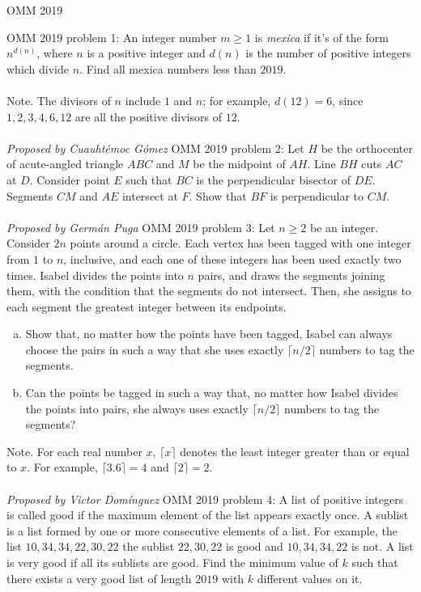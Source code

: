 
OMM 2019 

OMM 2019 problem 1:  An integer number $m\geq 1$ is \textit{mexica} if it's of the form $n^{d(n)}$, where $n$ is a positive integer and $d(n)$ is the number of positive integers which divide $n$. Find all mexica numbers less than $2019$. \\\\
Note. The divisors of $n$ include $1$ and $n$; for example, $d(12)=6$, since $1, 2, 3, 4, 6, 12$ are all the positive divisors of $12$. \\\\
\textit{Proposed by Cuauhtémoc Gómez} 
OMM 2019 problem 2:  Let $H$ be the orthocenter of acute-angled triangle $ABC$ and $M$ be the midpoint of $AH$. Line $BH$ cuts $AC$ at $D$. Consider point $E$ such that $BC$ is the perpendicular bisector of $DE$. Segments $CM$ and $AE$ intersect at $F$. Show that $BF$ is perpendicular to $CM$. \\\\
\textit{Proposed by Germán Puga} 
OMM 2019 problem 3:  Let $n\geq 2$ be an integer. Consider $2n$ points around a circle. Each vertex has been tagged with one integer from $1$ to $n$, inclusive, and each one of these integers has been used exactly two times. Isabel divides the points into $n$ pairs, and draws the segments joining them, with the condition that the segments do not intersect. Then, she assigns to each segment the greatest integer between its endpoints.
\begin{enumerate}[a)]
  \item Show that, no matter how the points have been tagged, Isabel can always choose the pairs in such a way that she uses exactly $\lceil n/2\rceil$ numbers to tag the segments.
  \item Can the points be tagged in such a way that, no matter how Isabel divides the points into pairs, she always uses exactly $\lceil n/2\rceil$ numbers to tag the segments?
\end{enumerate}
Note. For each real number $x$, $\lceil x\rceil$ denotes the least integer greater than or equal to $x$. For example, $\lceil 3.6\rceil=4$ and $\lceil 2\rceil=2$. \\\\
\textit{Proposed by Victor Domínguez} 
OMM 2019 problem 4:  A list of positive integers is called good if the maximum element of the list appears exactly once. A sublist is a list formed by one or more consecutive elements of a list. For example, the list $10,34,34,22,30,22$ the sublist $22,30,22$ is good and $10,34,34,22$ is not. A list is very good if all its sublists are good. Find the minimum value of $k$ such that there exists a very good list of length $2019$ with $k$ different values on it. 
